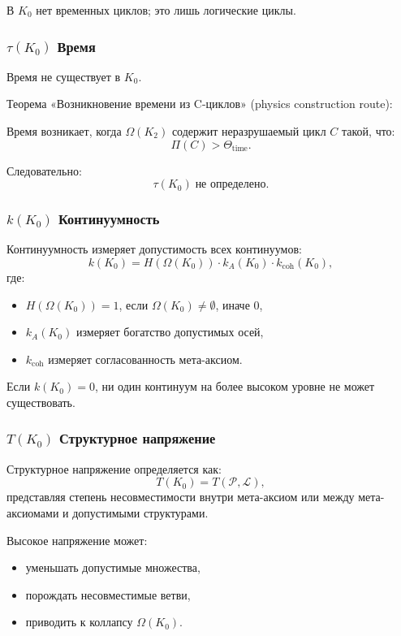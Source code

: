 В $K_0$ нет временных циклов; это лишь логические циклы.

\subsubsection{\texorpdfstring{$\tau(K_0)$}{\tau(K_0)} Время}

Время не существует в $K_0$.

Теорема «Возникновение времени из C-циклов» (physics construction route):

Время возникает, когда $\Omega(K_2)$ содержит неразрушаемый цикл
$C$ такой, что:
\[
\Pi(C) > \Theta_{\mathrm{time}}.
\]

Следовательно:
\[
\tau(K_0) \;\text{не определено}.
\]

\subsubsection{\texorpdfstring{$k(K_0)$}{k(K_0)} Континуумность}

Континуумность измеряет допустимость всех континуумов:
\[
k(K_0) =
H(\Omega(K_0)) \cdot
k_A(K_0) \cdot
k_{\mathrm{coh}}(K_0),
\]
где:
\begin{itemize}
    \item $H(\Omega(K_0)) = 1$, если $\Omega(K_0)\neq\emptyset$, иначе $0$,
    \item $k_A(K_0)$ измеряет богатство допустимых осей,
    \item $k_{\mathrm{coh}}$ измеряет согласованность мета-аксиом.
\end{itemize}

Если $k(K_0)=0$, ни один континуум на более высоком уровне не может
существовать.

\subsubsection{\texorpdfstring{$T(K_0)$}{T(K_0)} Структурное напряжение}

Структурное напряжение определяется как:
\[
T(K_0) = T(\mathcal{P}, \mathcal{L}),
\]
представляя степень несовместимости внутри мета-аксиом или между
мета-аксиомами и допустимыми структурами.

Высокое напряжение может:
\begin{itemize}
    \item уменьшать допустимые множества,
    \item порождать несовместимые ветви,
    \item приводить к коллапсу $\Omega(K_0)$.
\end{itemize}

